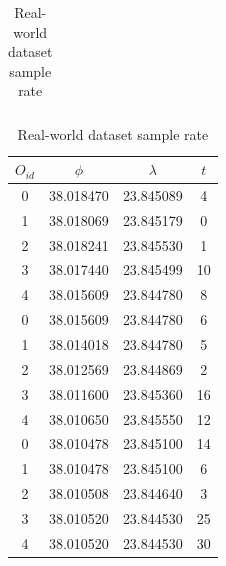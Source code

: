 \begin{table}[h!]
\begin{minipage}{0.5\textwidth}
\begin{tabular}{c c c c}
            \bottomrule
        \end{tabular}
    \end{minipage}%
    \hfill
    \begin{minipage}{0.5\textwidth}
        \centering
        \caption{Real-world dataset sample rate}
        \label{tbl:real_rate}
        \begin{tabular}{c c c c}
            \toprule
            \textbf{$O_{id}$} & \textbf{$\phi$} & \textbf{$\lambda$} & \textbf{$t$} \\
            \toprule
            0 & 38.018470 & 23.845089 & 4 \\
            1 & 38.018069 & 23.845179 & 0 \\
            2 & 38.018241 & 23.845530 & 1 \\
            3 & 38.017440 & 23.845499 & 10 \\
            4 & 38.015609 & 23.844780 & 8 \\
            \bottomrule
            0 & 38.015609 & 23.844780 & 6 \\
            1 & 38.014018 & 23.844780 & 5 \\
            2 & 38.012569 & 23.844869 & 2 \\
            3 & 38.011600 & 23.845360 & 16 \\
            4 & 38.010650 & 23.845550 & 12 \\
            \bottomrule
            0 & 38.010478 & 23.845100 & 14 \\
            1 & 38.010478 & 23.845100 & 6 \\
            2 & 38.010508 & 23.844640 & 3 \\
            3 & 38.010520 & 23.844530 & 25 \\
            4 & 38.010520 & 23.844530 & 30 \\
            \bottomrule
        \end{tabular}
    \end{minipage}
\end{table}

